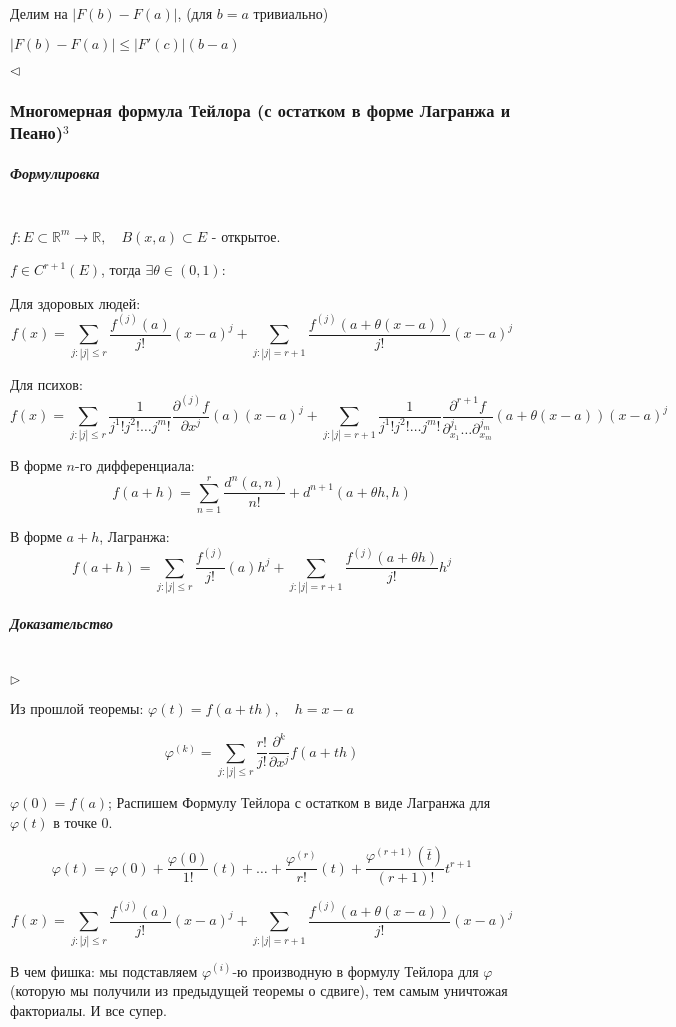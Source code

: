 \documentclass{article}
\let\vanillasubparagraph\subparagraph
\renewcommand{\subparagraph}[1]{\vanillasubparagraph{#1}\mbox{}\\}
\begin{document}
Делим на $|F(b) - F(a)|$, (для $b = a$ тривиально)

$|F(b) - F(a)| \leq |F'(c)| (b - a)$

$\lhd$

\subsubsection{Многомерная формула Тейлора (с остатком в форме Лагранжа и Пеано)\texorpdfstring{$^3$}{}}

\subparagraph{Формулировка}

$f: E \subset \mathbb R^m \to \mathbb R,\quad B(x,a) \subset E$ - открытое.

$f \in C^{r + 1}(E)$, тогда $\exists \theta \in (0,1):$

Для здоровых людей:
$$
f(x) = \sum_{j: |j| \leq r} \frac{f^{(j)}(a)}{j!}(x-a)^j + \sum_{j: |j| = r + 1} \frac{f^{(j)} (a + \theta(x-a))}{j!} (x-a)^j
$$

Для психов:
$$
f(x) = \sum_{j:|j| \leq r} \frac{1}{j^1!j^2!\dots j^m!} \frac {\partial^{(j)}f}{\partial x^j}(a) (x-a)^j + \sum_{j:|j|= r + 1} \frac{1} {j^1!j^2!\dots j^m!} \frac{\partial^{r + 1} f} {\partial_{x_1}^{j_1}\dots \partial_{x_m}^{j_m}} (a + \theta(x-a)) (x-a)^j
$$

В форме $n$-го дифференциала:
$$
f(a + h) = \sum_{n=1}^r \frac{d^n(a, n)}{n!} + d^{n+1}(a + \theta h, h)
$$

В форме $a + h$, Лагранжа:
$$
f(a + h) = \sum_{j:|j| \leq r} \frac{f^{(j)}}{j!}(a)h^j + \sum_{j: |j| = r + 1} \frac{f^{(j)}(a + \theta h)} {j!} h^j
$$

\subparagraph{Доказательство}

$\rhd$

Из прошлой теоремы: $\varphi(t) = f(a+th), \quad h = x - a$

$$
\varphi^{(k)} = \sum_{j:|j| \leq r} \frac{r!}{j!} \frac{\partial^k}{\partial x^j} f(a + th)
$$

$\varphi(0) = f(a)$; Распишем Формулу Тейлора с остатком в виде Лагранжа для $\varphi(t)$ в точке $0$.

$$
\varphi(t) = \varphi(0) + \frac{\varphi(0)}{1!}(t) + \dots + \frac{\varphi^{(r)}}{r!}(t) + \frac{\varphi^{(r + 1)} (\bar t)} {(r+1)!} t^{r+1}
$$

$$
f(x) = \sum_{j: |j| \leq r} \frac{f^{(j)}(a)}{j!} (x-a)^j + \sum_{j: |j| = r + 1} \frac{f^{(j)}(a + \theta(x-a))}{j!} (x-a)^j
$$

В чем фишка: мы подставляем $\varphi^{(i)}$-ю производную в формулу Тейлора для $\varphi$ (которую мы получили из предыдущей теоремы о сдвиге), тем самым уничтожая факториалы. И все супер.
\end{document}
